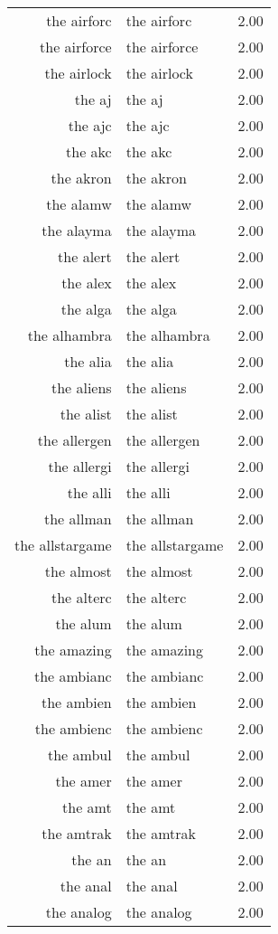 \begin{table}[ht]
\begin{tabular}{rlr}
  the airforc & the airforc & 2.00 \\ 
  the airforce & the airforce & 2.00 \\ 
  the airlock & the airlock & 2.00 \\ 
  the aj & the aj & 2.00 \\ 
  the ajc & the ajc & 2.00 \\ 
  the akc & the akc & 2.00 \\ 
  the akron & the akron & 2.00 \\ 
  the alamw & the alamw & 2.00 \\ 
  the alayma & the alayma & 2.00 \\ 
  the alert & the alert & 2.00 \\ 
  the alex & the alex & 2.00 \\ 
  the alga & the alga & 2.00 \\ 
  the alhambra & the alhambra & 2.00 \\ 
  the alia & the alia & 2.00 \\ 
  the aliens & the aliens & 2.00 \\ 
  the alist & the alist & 2.00 \\ 
  the allergen & the allergen & 2.00 \\ 
  the allergi & the allergi & 2.00 \\ 
  the alli & the alli & 2.00 \\ 
  the allman & the allman & 2.00 \\ 
  the allstargame & the allstargame & 2.00 \\ 
  the almost & the almost & 2.00 \\ 
  the alterc & the alterc & 2.00 \\ 
  the alum & the alum & 2.00 \\ 
  the amazing & the amazing & 2.00 \\ 
  the ambianc & the ambianc & 2.00 \\ 
  the ambien & the ambien & 2.00 \\ 
  the ambienc & the ambienc & 2.00 \\ 
  the ambul & the ambul & 2.00 \\ 
  the amer & the amer & 2.00 \\ 
  the amt & the amt & 2.00 \\ 
  the amtrak & the amtrak & 2.00 \\ 
  the an & the an & 2.00 \\ 
  the anal & the anal & 2.00 \\ 
  the analog & the analog & 2.00 \\ 

\end{tabular}
\end{table}
